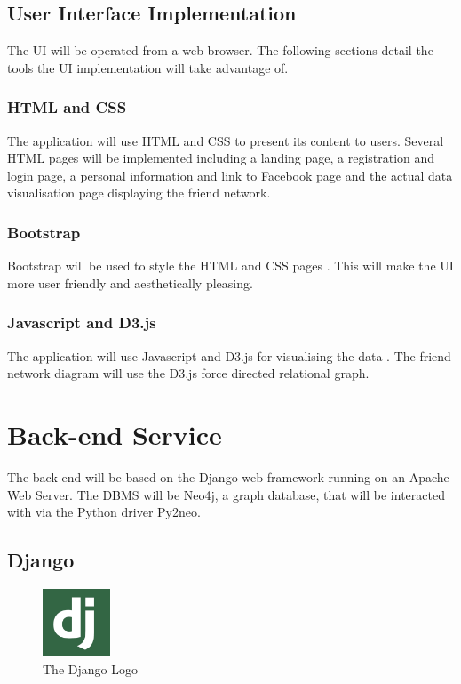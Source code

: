 \documentclass[10pt,onecolumn]{article}
\begin{document}
\subsection{User Interface Implementation}
The UI will be operated from a web browser. The following sections detail the tools the UI implementation will take advantage of.

\subsubsection{HTML and CSS}
The application will use HTML and CSS to present its content to users. Several HTML pages will be implemented including a landing page, a registration and login page, a personal information and link to Facebook page and the actual data visualisation page displaying the friend network.

\subsubsection{Bootstrap}
Bootstrap will be used to style the HTML and CSS pages \cite{Bootstrap}. This will make the UI more user friendly and aesthetically pleasing.

\subsubsection{Javascript and D3.js}
The application will use Javascript and D3.js for visualising the data \cite{D3}. The friend network diagram will use the D3.js force directed relational graph.

\section{Back-end Service}

The back-end will be based on the Django web framework running on an Apache Web Server. The DBMS will be Neo4j, a graph database, that will be interacted with via the Python driver Py2neo. 
\subsection{Django}
\begin{figure}
  \begin{center}
    \includegraphics[width=0.18\textwidth]{django}
  \end{center}
  \caption{The Django Logo}
\end{figure}
\end{document}
